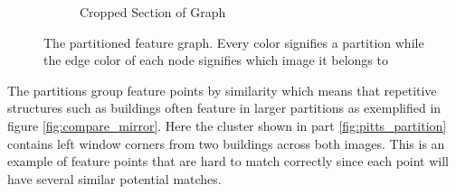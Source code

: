 \documentclass{article}
\begin{document}
\begin{figure}
{\begin{subfigure}[t]{0.60\textwidth}
			\caption{Cropped Section of Graph}
			\label{fig:cropped_graph}
		\end{subfigure}%
	}%
	\label{fig:graph}
	\caption{The partitioned feature graph. Every color signifies a 
partition while the edge color of each node signifies which image it 
belongs to}
\end{figure}

The partitions group feature points by similarity which means that 
repetitive structures such as buildings often feature in larger 
partitions as exemplified in figure \ref{fig:compare_mirror}. Here the 
cluster shown in part \ref{fig:pitts_partition} contains left window 
corners from two buildings across both images. This is an example of 
feature points that are hard to match correctly since each point will 
have several similar potential matches.
\end{document}
